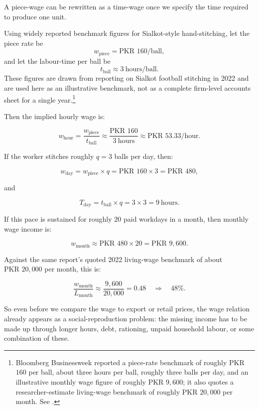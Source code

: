 \begin{example}
\label{ex:sialkot-piecewage}

A piece-wage can be rewritten as a time-wage once we specify the time required
to produce one unit.

Using widely reported benchmark figures for Sialkot-style hand-stitching, let
the piece rate be
\[
w_{\text{piece}}=\text{PKR }160/\text{ball},
\]
and let the labour-time per ball be
\[
t_{\text{ball}}\approx 3\ \text{hours/ball}.
\]
These figures are drawn from reporting on Sialkot football stitching in 2022 and
are used here as an illustrative benchmark, not as a complete firm-level accounts
sheet for a single year.\footnote{Bloomberg Businessweek reported a piece-rate
benchmark of roughly PKR \(160\) per ball, about three hours per ball, roughly
three balls per day, and an illustrative monthly wage figure of roughly
PKR \(9{,}600\); it also quotes a researcher-estimate living-wage benchmark of
roughly PKR \(20{,}000\) per month. See \cite{Bloomberg2022Sialkot}.}

Then the implied hourly wage is:

\[
w_{\text{hour}}
=
\frac{w_{\text{piece}}}{t_{\text{ball}}}
\approx
\frac{\text{PKR }160}{3\ \text{hours}}
\approx
\text{PKR }53.33/\text{hour}.
\]

If the worker stitches roughly \(q=3\) balls per day, then:

\[
w_{\text{day}}
=
w_{\text{piece}}\times q
=
\text{PKR }160 \times 3
=
\text{PKR }480,
\]

and

\[
T_{\text{day}}
=
t_{\text{ball}}\times q
=
3 \times 3
=
9\ \text{hours}.
\]

If this pace is sustained for roughly \(20\) paid workdays in a month, then
monthly wage income is:

\[
w_{\text{month}}
\approx
\text{PKR }480 \times 20
=
\text{PKR }9{,}600.
\]

Against the same report's quoted 2022 living-wage benchmark of about
\(\text{PKR }20{,}000\) per month, this is:

\[
\frac{w_{\text{month}}}{L_{\text{month}}}
\approx
\frac{9{,}600}{20{,}000}
=
0.48
\quad\Rightarrow\quad
48\%.
\]

So even before we compare the wage to export or retail prices, the wage relation
already appears as a social-reproduction problem: the missing income has to be
made up through longer hours, debt, rationing, unpaid household labour, or some
combination of these.


\end{example}

